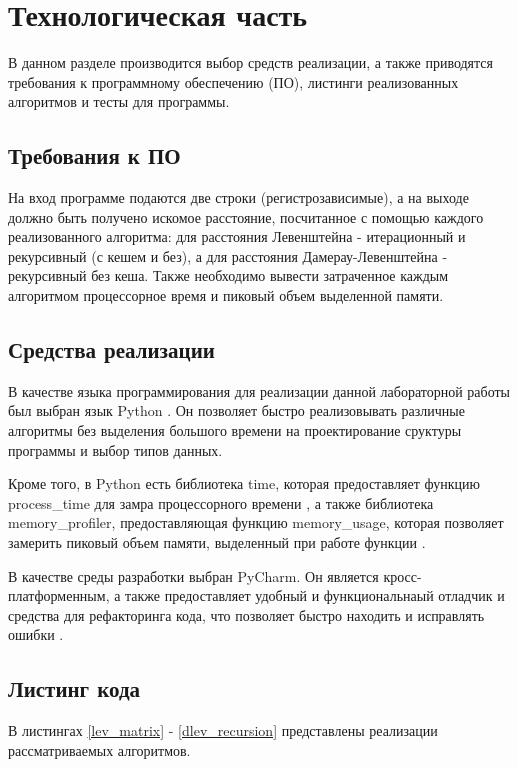 \chapter{Технологическая часть}

В данном разделе производится выбор средств реализации, а также приводятся требования к программному обеспечению (ПО), листинги реализованных алгоритмов и тесты для программы.

\section{Требования к ПО}

На вход программе подаются две строки (регистрозависимые), а на выходе должно быть получено искомое расстояние, посчитанное с помощью каждого реализованного алгоритма: для расстояния Левенштейна - итерационный и рекурсивный (с кешем и без), а для расстояния Дамерау-Левенштейна - рекурсивный без кеша. Также необходимо вывести затраченное каждым алгоритмом процессорное время и пиковый объем выделенной памяти.

\section{Средства реализации}

В качестве языка программирования для реализации данной лабораторной работы был выбран язык Python  \cite{PythonBook}. Он позволяет быстро реализовывать различные алгоритмы без выделения большого времени на проектирование сруктуры программы и выбор типов данных. 

Кроме того, в Python есть библиотека time, которая предоставляет функцию process\_time для замра процессорного времени \cite{process_time_text}, а также библиотека memory\_profiler, предоставляющая функцию memory\_usage, которая позволяет замерить пиковый объем памяти, выделенный при работе функции \cite{memory_usage_text}.

В качестве среды разработки выбран PyCharm. Он является кросс-платформенным, а также предоставляет удобный и функциональнаый отладчик и средства для рефакторинга кода, что позволяет быстро находить и исправлять ошибки \cite{pycharm}.

\section{Листинг кода}

В листингах \ref{lev_matrix} - \ref{dlev_recursion} представлены реализации рассматриваемых алгоритмов.

